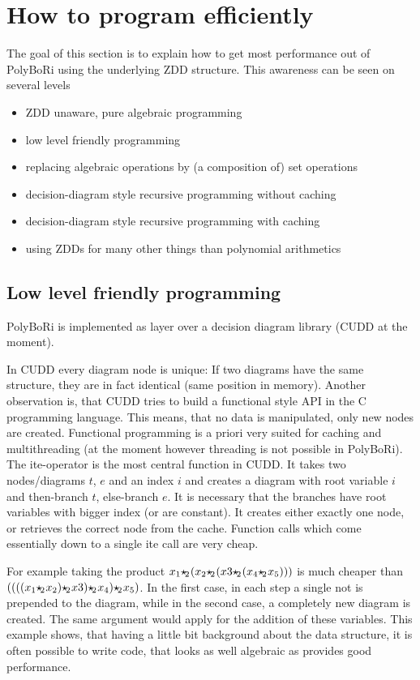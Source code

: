 \documentclass[]{article}
\newcommand{\PolyBoRi}{{\sc PolyBoRi}\xspace}
\newcommand{\CUDD}{{CUDD}\xspace}
\newcommand{\ite}{{ite}\xspace}
\providecommand{\boolemult}{\ensuremath{{\star\hspace{-.15em}_2\hspace{.05em}}}\xspace}
\newcounter{thm}
\begin{document}
\section{How to program efficiently}
The goal of this section is to explain how to get most performance out of \PolyBoRi using the underlying ZDD structure.
This awareness can be seen on several levels
\begin{itemize}
    \item ZDD unaware, pure algebraic programming 
    \item low level friendly programming
    \item replacing algebraic operations by (a composition of) set operations
    \item decision-diagram style recursive programming without caching
    \item decision-diagram style recursive programming with caching
    \item using ZDDs for many other things than polynomial arithmetics
\end{itemize}
\subsection{Low level friendly programming}
\label{low-level-friendly}
\PolyBoRi is implemented as layer over a decision diagram library (\CUDD at the moment).

In \CUDD every diagram node is unique: If two diagrams have the same structure, they are in fact identical (same position in memory).
Another observation is, that \CUDD tries to build a functional style API in the C programming language. This means, that no data is manipulated, only new nodes are created.
Functional programming is a priori very suited for caching and multithreading (at the moment however threading is not possible in \PolyBoRi).
The \ite-operator is the most central function in CUDD. It takes two nodes/diagrams $t$, $e$ and an index $i$ and creates a diagram with root variable $i$ and
then-branch $t$, else-branch $e$. It is necessary that the branches have root variables with bigger index (or are constant).
It creates either exactly one node, or retrieves the correct node from the cache.
Function calls which come essentially down to a single \ite call are very cheap.

For example taking the product $x_1 \boolemult (x_2\boolemult(x3\boolemult (x_4\boolemult x_5)))$ is much cheaper than $((((x_1 \boolemult x_2)\boolemult x3)\boolemult x_4)\boolemult x_5)$.
In the first case, in each step a single not is prepended to the diagram, while in the second case, a completely new diagram is created.
The same argument would apply for the addition of these variables.
This example shows, that having a little bit background about the data structure, it is often possible to write code, that looks as well algebraic as provides good performance.
\end{document}
